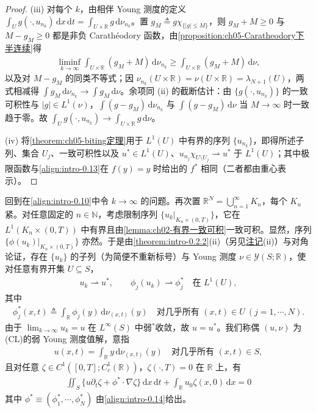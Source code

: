 \documentclass[../main.tex]{subfiles}
\begin{document}
\begin{proof}
(iii) 对每个 $k$，由相伴 Young 测度的定义 $\int_U g(\cdot,u_{n_k})\,\mathrm{d}x\,\mathrm{d}t=\int_{U\times\mathbb{R}}g\,\mathrm{d}\nu_{n_k}$。置 $g_M\triangleq g\chi_{\{|g|\leqslant M\}}$，则 $g_M+M\geqslant0$ 与 $M-g_M\geqslant0$ 都是非负 Carathéodory 函数，由\cref{proposition:ch05-Caratheodory下半连续}得
\begin{align*}
\liminf_{k\to\infty}\int_{U\times\mathbb{R}}(g_M+M)\,\mathrm{d}\nu_{n_k}
\geqslant\int_{U\times\mathbb{R}}(g_M+M)\,\mathrm{d}\nu,
\end{align*}
以及对 $M-g_M$ 的同类不等式；因 $\nu_{n_k}(U\times\mathbb{R})=\nu(U\times\mathbb{R})=\lambda_{N+1}(U)$，两式相减得 $\int g_M\,\mathrm{d}\nu_{n_k}\to\int g_M\,\mathrm{d}\nu$。余项同 (ii) 的截断估计：由 $\{g(\cdot,u_{n_k})\}$ 的一致可积性与 $|g|\in L^1(\nu)$，$\int(g-g_M)\,\mathrm{d}\nu_{n_k}$ 与 $\int(g-g_M)\,\mathrm{d}\nu$ 当 $M\to\infty$ 时一致趋于零。故 $\int_U g(\cdot,u_{n_k})\to\int_{U\times\mathbb{R}}g\,\mathrm{d}\nu$。

(iv) 将\cref{theorem:ch05-biting定理}用于 $L^1(U)$ 中有界的序列 $\{u_{n_k}\}$，即得所述子列、集合 $U_j$、一致可积性以及 $u^*\in L^1(U)$、$u_{n_j}\chi_{U\setminus U_j}\rightharpoonup u^*$ 于 $L^1(U)$；其中极限函数与\eqref{align:intro-0.13}在 $f(y)=y$ 时给出的 $f^*$ 相同（二者都由重心表示）。
\end{proof}

回到在\eqref{align:intro-0.10}中令 $k\to\infty$ 的问题。再次置 $\mathbb{R}^N=\bigcup_{n=1}^\infty K_n$，每个 $K_n$ 紧。对任意固定的 $n\in\mathbb{N}$，考虑限制序列 $\{u_k|_{K_n\times(0,T)}\}$，它在 $L^1(K_n\times(0,T))$ 中有界且由\cref{lemma:ch02-有界一致可积}一致可积。显然，序列 $\{\phi(u_k)|_{K_n\times(0,T)}\}$ 亦然。于是由\cref{theorem:intro-0.2.2}(ii)（另见\hyperref[remark:ch05-收敛注]{注记}(ii)）与对角论证，存在 $\{u_k\}$ 的子列（为简便不重新标号）与 Young 测度 $\nu\in\mathcal{Y}(S;\mathbb{R})$，使对任意有界开集 $U\subseteq S$，
\begin{align*}
u_k\rightharpoonup u^*,\qquad
\phi_j(u_k)\rightharpoonup\phi_j^* \quad \text{在 }L^1(U),
\end{align*}
其中
\begin{align}
\phi_j^*(x,t) \triangleq  \int_{\mathbb{R}}\phi_j(y)\,\mathrm{d}\nu_{(x,t)}(y)
\quad \text{对几乎所有 }(x,t)\in U\ (j=1,\cdots ,N). \label{align:intro-0.14}
\end{align}
由于 $\lim_{k\to\infty}u_k=u$ 在 $L^\infty(S)$ 中弱$^*$收敛，故 $u=u^*$。我们称偶 $(u,\nu)$ 为(CL)的弱 Young 测度值解，意指
\begin{align}
u(x,t) = \int_{\mathbb{R}}y\,\mathrm{d}\nu_{(x,t)}(y)
\quad \text{对几乎所有 }(x,t)\in S, \label{align:intro-0.15a}
\end{align}
且对任意 $\zeta\in C^1([0,T];C^1_c(\mathbb{R}))$，$\zeta(\cdot,T)=0$ 在 $\mathbb{R}$ 上，有
\begin{align}
\iint_S\{u\partial_t\zeta + \phi^*\cdot\nabla\zeta\}\,\mathrm{d}x\,\mathrm{d}t
+ \int_{\mathbb{R}}u_0\zeta(x,0)\,\mathrm{d}x = 0 \label{align:intro-0.15b}
\end{align}
其中 $\phi^*\equiv(\phi^*_1,\cdots ,\phi^*_N)$ 由\eqref{align:intro-0.14}给出。
\end{document}
